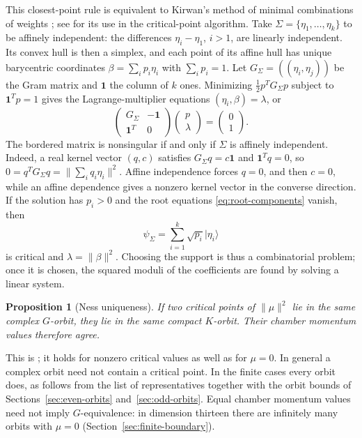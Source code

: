\documentclass{article}
\newtheorem{proposition}[theorem]{Proposition}
\theoremstyle{definition}
\theoremstyle{remark}
\newcommand{\ket}[1]{\lvert #1\rangle}
\newcommand{\norm}[1]{\lVert #1\rVert}
\begin{document}
This closest-point rule is equivalent to Kirwan's method of minimal combinations of
weights \cite{Kirwan_cohomology_84}; see
\cite{MaciazekSawicki2015} for its use in the
critical-point algorithm. Take $\Sigma=\{\eta_1,\ldots,\eta_k\}$
to be affinely independent: the differences $\eta_i-\eta_1$, $i>1$,
are linearly independent. Its convex hull is then a simplex, and each
point of its affine hull has unique barycentric coordinates
$\beta=\sum_i p_i\eta_i$ with $\sum_i p_i=1$.
Let $G_\Sigma=((\eta_i,\eta_j))$ be the Gram matrix and $\mathbf1$
the column of $k$ ones. Minimizing $\frac12p^TG_\Sigma p$ subject to
$\mathbf1^Tp=1$ gives the Lagrange-multiplier equations
$(\eta_i,\beta)=\lambda$, or
\begin{equation}
 \begin{pmatrix}
  G_\Sigma&-\mathbf1\\
  \mathbf1^T&0
 \end{pmatrix}
 \begin{pmatrix}p\\ \lambda\end{pmatrix}
 =
 \begin{pmatrix}0\\1\end{pmatrix}.
 \label{eq:bordered-gram-general}
\end{equation}
The bordered matrix is nonsingular if and only if $\Sigma$
is affinely independent. Indeed, a real kernel vector $(q,c)$ satisfies
$G_\Sigma q=c\mathbf1$ and $\mathbf1^Tq=0$, so
$0=q^TG_\Sigma q=\norm{\sum_iq_i\eta_i}^2$. Affine independence
forces $q=0$, and then $c=0$, while an affine dependence gives a nonzero
kernel vector in the converse direction.  If the solution has $p_i>0$ and the root equations
\eqref{eq:root-components} vanish, then
\begin{equation}
 \psi_\Sigma=\sum_{i=1}^k\sqrt{p_i}\ket{\eta_i}
 \label{eq:state-from-probabilities}
\end{equation}
is critical and $\lambda=\norm\beta^2$. Choosing the support is thus a combinatorial problem; once it is chosen,
the squared moduli of the coefficients are found by solving a linear
system.
\begin{proposition}[Ness uniqueness]
\label{prop:ness-uniqueness}
If two critical points of $\norm\mu^2$ lie in the same complex
$G$-orbit, they lie in the same compact $K$-orbit. Their chamber
momentum values therefore agree.
\end{proposition}

This is \cite[Theorem~7.1]{Ness1984}; it holds for nonzero critical
values as well as for $\mu=0$. In general a complex orbit need not
contain a critical point. In the finite cases every orbit does, as
follows from the list of representatives together with the orbit bounds
of Sections~\ref{sec:even-orbits} and~\ref{sec:odd-orbits}. Equal chamber
momentum values need not imply $G$-equivalence: in dimension thirteen there are infinitely
many orbits with $\mu=0$ (Section~\ref{sec:finite-boundary}).
\end{document}
